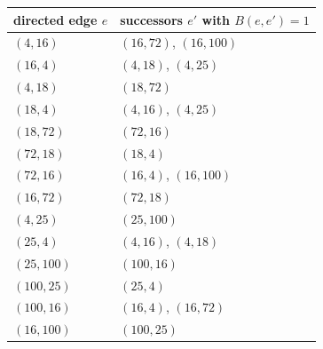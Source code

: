 \begin{tabular}{ll}\toprule directed edge $e$ & successors $e'$ with $B(e,e')=1$\\\midrule
$(4,16)$ & $(16,72)$, $(16,100)$\\
$(16,4)$ & $(4,18)$, $(4,25)$\\
$(4,18)$ & $(18,72)$\\
$(18,4)$ & $(4,16)$, $(4,25)$\\
$(18,72)$ & $(72,16)$\\
$(72,18)$ & $(18,4)$\\
$(72,16)$ & $(16,4)$, $(16,100)$\\
$(16,72)$ & $(72,18)$\\
$(4,25)$ & $(25,100)$\\
$(25,4)$ & $(4,16)$, $(4,18)$\\
$(25,100)$ & $(100,16)$\\
$(100,25)$ & $(25,4)$\\
$(100,16)$ & $(16,4)$, $(16,72)$\\
$(16,100)$ & $(100,25)$\\
\bottomrule\end{tabular}
